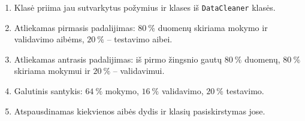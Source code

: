 \begin{enumerate}
    \item Klasė priima jau sutvarkytus požymius ir klases iš \texttt{DataCleaner} klasės.
    \item Atliekamas pirmasis padalijimas: $80\ \%$ duomenų skiriama mokymo ir validavimo aibėms, $20\ \%$ – testavimo aibei.
    \item Atliekamas antrasis padalijimas: iš pirmo žingsnio gautų $80\ \%$ duomenų, $80\ \%$ skiriama mokymui ir $20\ \%$ – validavimui.
    \item Galutinis santykis: $64\ \%$ mokymo, $16\ \%$ validavimo, $20\ \%$ testavimo.
    \item Atspausdinamas kiekvienos aibės dydis ir klasių pasiskirstymas jose.
\end{enumerate}